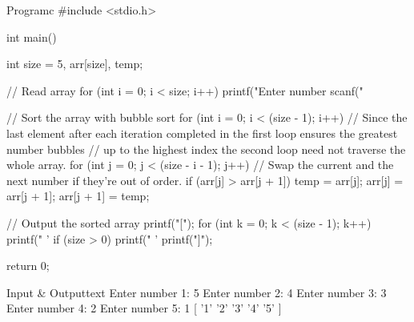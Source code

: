 \documentclass[11pt]{ipu-c}
\begin{document}
    \newpage
    \begin{code}
        {Program}{c}
#include <stdio.h>

int main() {
    int size = 5, arr[size], temp;

    // Read array
    for (int i = 0; i < size; i++) {
        printf("Enter number %
        scanf("%
    }

    // Sort the array with bubble sort
    for (int i = 0; i < (size - 1); i++) {
        // Since the last element after each iteration completed in the first loop ensures the greatest number bubbles
        // up to the highest index the second loop need not traverse the whole array.
        for (int j = 0; j < (size - i - 1); j++) {
            // Swap the current and the next number if they're out of order.
            if (arr[j] > arr[j + 1]) {
                temp = arr[j];
                arr[j] = arr[j + 1];
                arr[j + 1] = temp;
            }
        }
    }

    // Output the sorted array
    printf("[");
    for (int k = 0; k < (size - 1); k++) {
        printf(" '%
    }
    if (size > 0) {
        printf(" '%
    }
    printf("]");

    return 0;
}
    \end{code}
    \begin{code}
        {Input \& Output}{text}
Enter number 1: 5
Enter number 2: 4
Enter number 3: 3
Enter number 4: 2
Enter number 5: 1
[ '1'  '2'  '3'  '4'  '5' ]
    \end{code}
\end{document}
